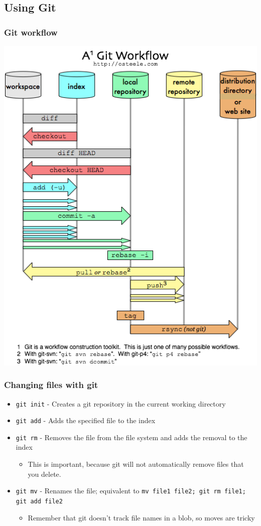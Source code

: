 \documentclass{beamer}
\begin{document}
\subsection{Using Git}

\begin{frame}
  \frametitle{Git workflow}
  \includegraphics[scale = 0.3]{images/git-workflow.png}
\end{frame}

\begin{frame}
  \frametitle{Changing files with git}
  \begin{itemize}
    \item {\tt git init} - Creates a git repository in the current working directory
    \item {\tt git add} - Adds the specified file to the index
    \item {\tt git rm} - Removes the file from the file system and adds the removal to the index
      \begin{itemize}
	\item This is important, because git will not automatically remove files that you delete.
      \end{itemize}
    \item {\tt git mv} - Renames the file; equivalent to {\tt mv file1 file2; git rm file1; git add file2}
      \begin{itemize}
	\item Remember that git doesn't track file names in a blob, so moves are tricky
      \end{itemize}
  \end{itemize}
\end{frame}
\end{document}
